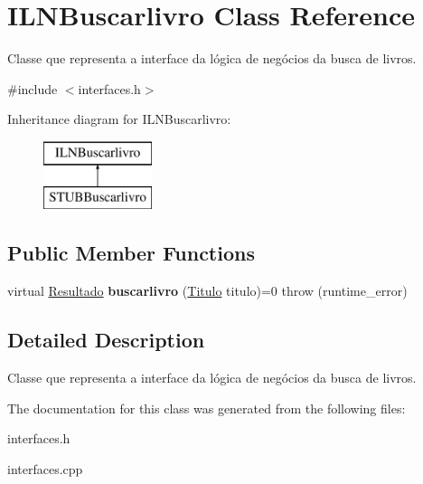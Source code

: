 \hypertarget{classILNBuscarlivro}{}\section{I\+L\+N\+Buscarlivro Class Reference}
\label{classILNBuscarlivro}


Classe que representa a interface da lógica de negócios da busca de livros.  




{\ttfamily \#include $<$interfaces.\+h$>$}

Inheritance diagram for I\+L\+N\+Buscarlivro\+:\begin{figure}[H]
\begin{center}
\leavevmode
\includegraphics[height=2.000000cm]{classILNBuscarlivro}
\end{center}
\end{figure}
\subsection*{Public Member Functions}
\begin{DoxyCompactItemize}
\item 
\mbox{\label{classILNBuscarlivro_ae04cb0c1a3461c65c07d5b97ffc0a926}} 
virtual \hyperlink{classResultado}{Resultado} {\bfseries buscarlivro} (\hyperlink{classTitulo}{Titulo} titulo)=0  throw (runtime\+\_\+error)
\end{DoxyCompactItemize}


\subsection{Detailed Description}
Classe que representa a interface da lógica de negócios da busca de livros. 

The documentation for this class was generated from the following files\+:\begin{DoxyCompactItemize}
\item 
interfaces.\+h\item 
interfaces.\+cpp\end{DoxyCompactItemize}
